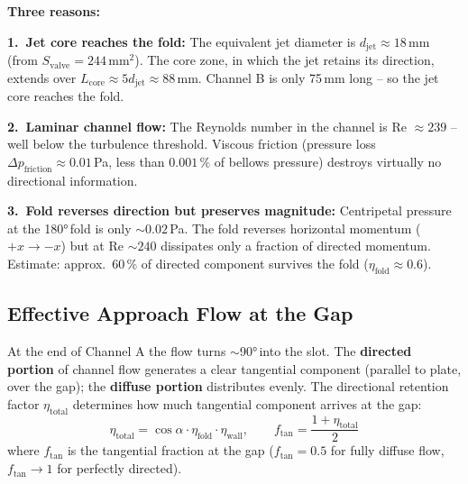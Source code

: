 \documentclass[11pt,a4paper]{article}
\begin{document}
\textbf{Three reasons:}

\textbf{1.\ Jet core reaches the fold:} The equivalent jet diameter is $d_\text{jet} \approx 18$\,mm (from $S_\text{valve} = 244$\,mm$^2$). The core zone, in which the jet retains its direction, extends over $L_\text{core} \approx 5 d_\text{jet} \approx 88$\,mm. Channel B is only 75\,mm long -- so the jet core reaches the fold.

\textbf{2.\ Laminar channel flow:} The Reynolds number in the channel is Re $\approx 239$ -- well below the turbulence threshold. Viscous friction (pressure loss $\Delta p_\text{friction} \approx 0.01$\,Pa, less than $0.001\,\%$ of bellows pressure) destroys virtually no directional information.

\textbf{3.\ Fold reverses direction but preserves magnitude:} Centripetal pressure at the 180°\,fold is only $\sim 0.02$\,Pa. The fold reverses horizontal momentum ($+x \rightarrow -x$) but at Re $\sim 240$ dissipates only a fraction of directed momentum. Estimate: approx.\ 60\,\% of directed component survives the fold ($\eta_\text{fold} \approx 0.6$).

\subsection{Effective Approach Flow at the Gap}

At the end of Channel A the flow turns $\sim$90°\,into the slot. The \textbf{directed portion} of channel flow generates a clear tangential component (parallel to plate, over the gap); the \textbf{diffuse portion} distributes evenly. The directional retention factor $\eta_\text{total}$ determines how much tangential component arrives at the gap:
\begin{equation}
\eta_\text{total} = \cos\alpha \cdot \eta_\text{fold} \cdot \eta_\text{wall}, \qquad
f_\text{tan} = \frac{1 + \eta_\text{total}}{2}
\end{equation}
where $f_\text{tan}$ is the tangential fraction at the gap ($f_\text{tan} = 0.5$ for fully diffuse flow, $f_\text{tan} \to 1$ for perfectly directed).
\end{document}
